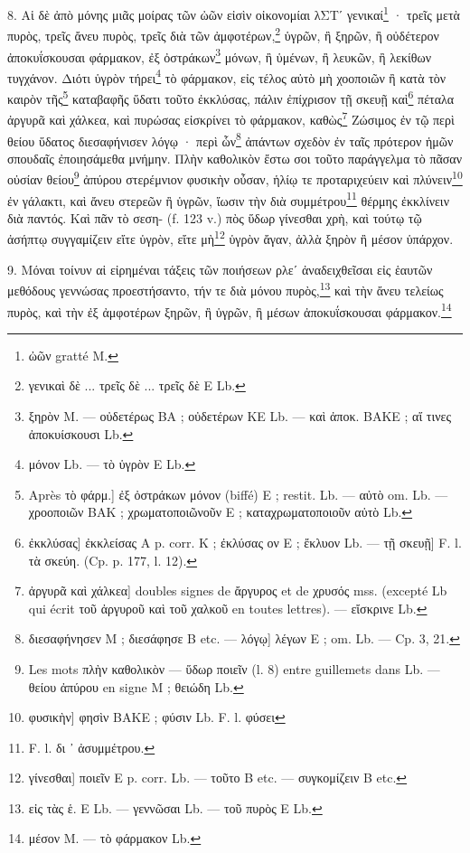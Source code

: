\documentclass[a4paper, 11pt, oneside, polutonikogreek, french]{article}
\begin{document}
8. Αἱ δὲ ἀπὸ μόνης μιᾶς μοίρας τῶν ὠῶν εἰσὶν οἰκονομίαι λΣΤʹ γενικαί\footnote{ὠῶν gratté M.} · τρεῖς μετὰ πυρὸς, τρεῖς ἄνευ πυρὸς, τρεῖς διὰ τῶν ἀμφοτέρων,\footnote{γενικαὶ δὲ ... τρεῖς δὲ ... τρεῖς δὲ E Lb.} ὑγρῶν, ἢ ξηρῶν, ἢ οὐδέτερον ἀποκυΐσκουσαι φάρμακον, ἐξ ὀστράκων\footnote{ξηρὸν M. --- οὐδετέρως BA ; οὐδετέρων KE Lb. --- καὶ ἀποκ. BAKE ; αἵ τινες ἀποκυίσκουσι Lb.} μόνων, ἢ ὑμένων, ἢ λευκῶν, ἢ λεκίθων τυγχάνον. Διότι ὑγρὸν τήρει\footnote{μόνον Lb. --- τὸ ὑγρὸν E Lb.} τὸ φάρμακον, εἰς τέλος αὐτὸ μὴ χοοποιῶν ἢ κατὰ τὸν καιρὸν τῆς\footnote{Après τὸ φάρμ.] ἐξ ὀστράκων μόνον (biffé) E ; restit. Lb. --- αὐτὸ om. Lb. --- χροοποιῶν BAK ; χρωματοποιῶνοῦν E ; καταχρωματοποιοῦν αὐτὸ Lb.} καταβαφῆς ὕδατι τοῦτο ἐκκλύσας, πάλιν ἐπίχρισον τῇ σκευῇ καὶ\footnote{ἐκκλύσας] ἐκκλείσας A p. corr. K ; ἐκλύσας ον E ; ἔκλυον Lb. --- τῇ σκευῇ] F. l. τὰ σκεύη. (Cp. p. 177, l. 12).} πέταλα ἀργυρᾶ καὶ χάλκεα, καὶ πυρώσας εἰσκρίνει τὸ φάρμακον, καθὼς\footnote{ἀργυρᾶ καὶ χάλκεα] doubles signes de ἄργυρος et de χρυσός mss. (excepté Lb qui écrit τοῦ ἀργυροῦ καὶ τοῦ χαλκοῦ en toutes lettres). --- εἴσκρινε Lb.} Ζώσιμος ἐν τῷ περὶ θείου ὕδατος διεσαφήνισεν λόγῳ · περὶ ὧν\footnote{διεσαφήνησεν M ; διεσάφησε B etc. --- λόγῳ] λέγων E ; om. Lb. --- Cp. 3, 21.} ἀπάντων σχεδὸν ἐν ταῖς πρότερον ἡμῶν σπουδαῖς ἐποιησάμεθα μνήμην. Πλὴν καθολικὸν ἔστω σοι τοῦτο παράγγελμα τὸ πᾶσαν οὐσίαν θείου\footnote{Les mots πλὴν καθολικὸν --- ὕδωρ ποιεῖν (l. 8) entre guillemets dans Lb. --- θείου ἀπύρου en signe M ; θειώδη Lb.} ἀπύρου στερέμνιον φυσικὴν οὖσαν, ἡλίῳ τε προταριχεύειν καὶ πλύνειν\footnote{φυσικὴν] φησὶν BAKE ; φύσιν Lb. F. l. φύσει} ἐν γάλακτι, καὶ ἄνευ στερεῶν ἢ ὑγρῶν, ἴωσιν τὴν διὰ συμμέτρου\footnote{F. l. δι ᾽ ἀσυμμέτρου.} θέρμης ἐκκλίνειν διὰ παντός. Καὶ πᾶν τὸ σεση- (f. 123 v.) πὸς ὕδωρ γίνεσθαι χρὴ, καὶ τούτῳ τῷ ἀσήπτῳ συγγαμίζειν εἴτε ὑγρὸν, εἴτε μὴ\footnote{γίνεσθαι] ποιεῖν E p. corr. Lb. --- τοῦτο B etc. --- συγκομίζειν B etc.} ὑγρὸν ἄγαν, ἀλλὰ ξηρὸν ἢ μέσον ὑπάρχον.

9. Μόναι τοίνυν αἱ εἰρημέναι τάξεις τῶν ποιήσεων ρλεʹ ἀναδειχθεῖσαι εἰς ἑαυτῶν μεθόδους γεννώσας προεστήσαντο, τήν τε διὰ μόνου πυρὸς,\footnote{εἰς τὰς ἑ. E Lb. --- γεννῶσαι Lb. --- τοῦ πυρὸς E Lb.} καὶ τὴν ἄνευ τελείως πυρὸς, καὶ τὴν ἐξ ἀμφοτέρων ξηρῶν, ἢ ὑγρῶν, ἢ μέσων ἀποκυΐσκουσαι φάρμακον.\footnote{μέσον M. --- τὸ φάρμακον Lb.}
\end{document}
